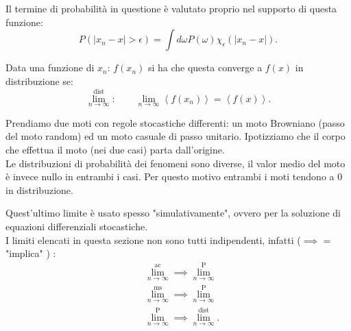 \usetikzlibrary{math}
\begin{center}
\end{center}
\noindent
Il termine di probabilità in questione è valutato proprio nel supporto di questa funzione:
\[
    P(\left|x_n-x\right|>\epsilon) = \int d\omega P(\omega) \chi_\epsilon (\left|x_n-x\right|) 
.\] 
\begin{defn}[\textcolor{red}{Limite in distribuzione}]
    Data una funzione di $x_n$: $f(x_n)$ si ha che questa converge a $f(x)$ in distribuzione se:
    \[
	\lim^{\text{dist}}_{n \to \infty}: \qquad \lim_{n \to \infty} \left<f(x_n)\right> = \left<f(x)\right>
    .\] 
\end{defn}
\begin{exmp}
    Prendiamo due moti con regole stocastiche differenti: un moto Browniano (passo del moto random) ed un moto casuale di passo unitario.
    Ipotizziamo che il corpo che effettua il moto (nei due casi) parta dall'origine.\\
    Le distribuzioni di probabilità dei fenomeni sono diverse, il valor medio del moto è invece nullo in entrambi i casi. Per questo motivo entrambi i moti tendono a 0 in distribuzione.
\end{exmp}
\noindent
Quest'ultimo limite è usato spesso "simulativamente", ovvero per la soluzione di equazioni differenziali stocastiche.\\
I limiti elencati in questa sezione non sono tutti indipendenti, infatti ($\implies$ = "implica" ) :
\[\begin{aligned}
    & \lim^{\text{ac}}_{n \to \infty} \implies  \lim^{\text{P}}_{n \to \infty} \\
    & \lim^{\text{ms}}_{n \to \infty} \implies  \lim^{\text{P}}_{n \to \infty} \\
    & \lim^{\text{P}}_{n \to \infty} \implies \lim^{\text{dist}}_{n \to \infty}  
.\end{aligned}\]


